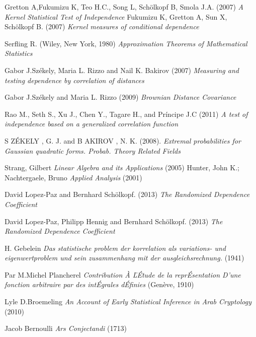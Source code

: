 \documentclass[epsbased,copyright,final,english,printable,covers,extendedindex,firstnumbered,tfg,gnuplot]{tfgtfmthesisuam}
\begin{document}
\begin{thebibliography}{9}

 Gretton A,Fukumizu K, Teo H.C., Song L, Schölkopf B, Smola J.A.
(2007)
\textit{A Kernel Statistical Test of Independence}
 Fukumizu K, Gretton A, Sun X, Schölkopf B. (2007)
\textit{Kernel measures of conditional dependence}
 
 Serfling R.
(Wiley, New York, 1980)
\textit{Approximation Theorems of Mathematical Statistics}

 Gabor J.Székely, Maria L. Rizzo and Nail K. Bakirov
(2007)
\textit{Measuring and testing dependence by correlation of distances}

 Gabor J.Székely and Maria L. Rizzo
(2009)
\textit{Brownian Distance Covariance}

 Rao M., Seth S., Xu J., Chen Y., Tagare H., and Príncipe J.C (2011)
\textit{A test of independence based on a generalized correlation function}

 S ZÉKELY , G. J. and B AKIROV , N. K. (2008).
\textit{Extremal probabilities for Gaussian quadratic
forms. Probab. Theory Related Fields}
 
 Strang, Gilbert 
\textit{Linear Algebra and its Applications}
(2005)
 Hunter, John K.; Nachtergaele, Bruno 
\textit{ Applied Analysis}
(2001)


 David Lopez-Paz and Bernhard Schölkopf.
(2013)
\textit{The Randomized Dependence Coefficient}

 David Lopez-Paz, Philipp Hennig and Bernhard Schölkopf.
(2013)
\textit{The Randomized Dependence Coefficient}

 H. Gebelein
\textit{Das statistische problem der korrelation als variations- und eigenwertproblem und sein zusammenhang mit der ausgleichsrechnung.} (1941)

 Par M.Michel Plancherel
\textit{Contribution À ĽÉtude de la reprÉsentation D’une fonction arbitraire par des intÉgrales dÉfinies}
(Genève, 1910)

 Lyle D.Broemeling
\textit{An Account of Early Statistical Inference in Arab Cryptology}
(2010)

  Jacob Bernoulli
\textit{Ars Conjectandi}
(1713)

\end{thebibliography}
\end{document}
